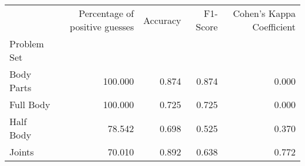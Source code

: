 \begin{table}
    \caption[]{}
    \label{}
    \begin{tabular}{lrrrr}
        \hline
        {} &  Percentage of positive guesses &  Accuracy &  F1-Score &  Cohen's Kappa Coefficient \\
        Problem Set   &                                 &           &           &                            \\
        \hline
        Body Parts &                         100.000 &     0.874 &     0.874 &                      0.000 \\
        Full Body  &                         100.000 &     0.725 &     0.725 &                      0.000 \\
        Half Body  &                          78.542 &     0.698 &     0.525 &                      0.370 \\
        Joints     &                          70.010 &     0.892 &     0.638 &                      0.772 \\
        \hline
    \end{tabular}
\end{table}